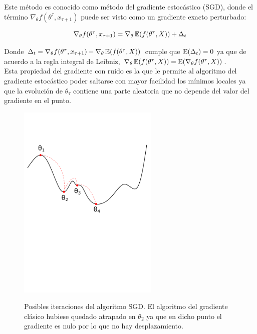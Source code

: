 \begin{mdframed}[style=pendiente, frametitle={\center Método del gradiente estocástico}]
Este método es conocido como método del gradiente estocástico (SGD), donde el término $\nabla_\theta f(\theta^\tau,x_{\tau+1})$ puede ser visto como un gradiente exacto perturbado:

\begin{equation}
	\nabla_\theta f(\theta^\tau,x_{\tau+1}) = \nabla_\theta\operatorname{\mathbb{E}}(f(\theta^\tau,X)) + \Delta_t
\end{equation}

Donde $\Delta_t = \nabla_\theta f(\theta^\tau,x_{\tau+1}) - \nabla_\theta \operatorname{\mathbb{E}}( f(\theta^\tau,X))$ cumple que $\operatorname{\mathbb{E}}(\Delta_t)=0$ ya que de acuerdo a la regla integral de Leibniz, $\nabla_\theta \operatorname{\mathbb{E}}( f(\theta^\tau,X)) =  \operatorname{\mathbb{E}}(\nabla_\theta f(\theta^\tau,X))$.\\


Esta propiedad del gradiente con ruido es la que le permite al algoritmo del gradiente estocástico poder saltarse con mayor facilidad los mínimos locales ya que la evolución de $\theta_\tau$ contiene una parte aleatoria que no depende del valor del gradiente en el punto.


\begin{figure}[H]
	\centering
	\includegraphics[width=0.6\textwidth]{img/cap3_sgd.pdf}\\
	\caption{Posibles iteraciones del algoritmo SGD. El algoritmo del gradiente clásico hubiese quedado atrapado en $\theta_2$ ya que en dicho punto el gradiente es nulo por lo que no hay desplazamiento.}
\end{figure}


\end{mdframed}
